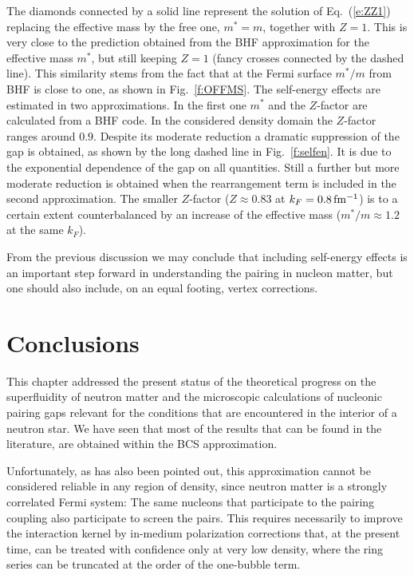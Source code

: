 \documentclass[runningheads]{svmult}
\begin{document}
The diamonds connected by a solid line represent the solution
of Eq.~(\ref{e:ZZ1}) replacing the effective mass by the free one, 
$m^*=m$, together with $Z=1$. 
This is very close to the prediction obtained from the BHF
approximation for the effective mass $m^*$, but still keeping $Z=1$
(fancy crosses connected by the dashed line).
This similarity stems from the fact that at the Fermi surface
$m^*/m$ from BHF is close to one, as shown in Fig.~\ref{f:OFFMS}.
The self-energy effects are estimated in two approximations. 
In the first one $m^*$ and the $Z$-factor are calculated from a BHF code. 
In the considered density domain the $Z$-factor ranges around $0.9$.
Despite its moderate reduction a dramatic suppression of the gap is
obtained, as shown by the long dashed line in Fig.~\ref{f:selfen}.
It is due to the exponential dependence of the gap on all quantities.
Still a further but more moderate reduction is
obtained when the rearrangement term is included in the second approximation. 
The smaller $Z$-factor ($Z\approx 0.83$ at $k_F=0.8\,\rm fm^{-1}$)
is to a certain extent counterbalanced by an increase of the effective mass 
($m^*/m \approx 1.2$ at the same $k_F$).

From the previous discussion we may conclude that including self-energy 
effects is an important step forward in understanding the pairing in nucleon 
matter, but one should also include, on an equal footing, vertex corrections. 
                                 

\section{Conclusions}

This chapter addressed the present status of the theoretical progress on
the superfluidity of neutron matter and the microscopic calculations
of nucleonic pairing gaps relevant for the conditions that are encountered
in the interior of a neutron star. 
We have seen that most of the results that can be found in the
literature, are obtained within the BCS approximation.

Unfortunately, as has also been pointed out, this approximation cannot
be considered reliable in any region of density,
since neutron matter is a strongly correlated Fermi system:
The same nucleons that participate to the pairing coupling also participate
to screen the pairs. 
This requires necessarily to improve the interaction kernel by in-medium 
polarization corrections that, at the present time, 
can be treated with confidence only at very low density,   
where the ring series can be truncated at the order of the one-bubble term.
\end{document}

